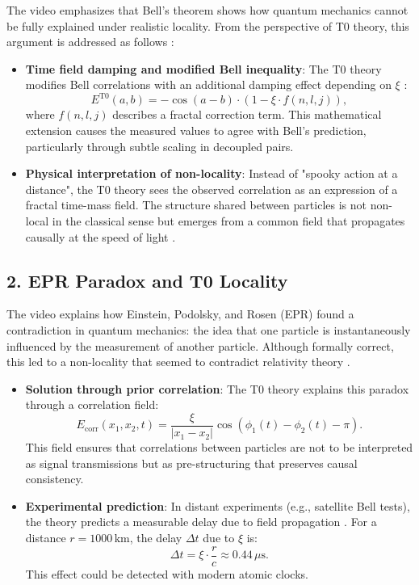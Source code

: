 	The video emphasizes that Bell's theorem shows how quantum mechanics cannot be fully explained under realistic locality. From the perspective of T0 theory, this argument is addressed as follows \cite{Bell_En, NoGoEn, 023_Bell_En_ch}:
	
	\begin{itemize}
		\item \textbf{Time field damping and modified Bell inequality}: The T0 theory modifies Bell correlations with an additional damping effect depending on $\xi$ \cite{Bell_En}:
		\[
		E^{\mathrm{T0}}(a,b) = -\cos(a-b) \cdot (1 - \xi \cdot f(n,l,j)),
		\]
		where $f(n,l,j)$ describes a fractal correction term. This mathematical extension causes the measured values to agree with Bell's prediction, particularly through subtle scaling in decoupled pairs.
		
		\item \textbf{Physical interpretation of non-locality}: Instead of "spooky action at a distance", the T0 theory sees the observed correlation as an expression of a fractal time-mass field. The structure shared between particles is not non-local in the classical sense but emerges from a common field that propagates causally at the speed of light \cite{131_scheinbar_instantan_En}.
	\end{itemize}
	
	\subsection*{2. EPR Paradox and T0 Locality}
	
	The video explains how Einstein, Podolsky, and Rosen (EPR) found a contradiction in quantum mechanics: the idea that one particle is instantaneously influenced by the measurement of another particle. Although formally correct, this led to a non-locality that seemed to contradict relativity theory \cite{VideoBell2024}.
	
	\begin{itemize}
		\item \textbf{Solution through prior correlation}: The T0 theory explains this paradox through a correlation field:
		\[
		E_{\mathrm{corr}}(x_1, x_2, t) = \frac{\xi}{|x_1 - x_2|} \cos\left(\phi_1(t) - \phi_2(t) - \pi\right).
		\]
		This field ensures that correlations between particles are not to be interpreted as signal transmissions but as pre-structuring that preserves causal consistency.
		
		\item \textbf{Experimental prediction}: In distant experiments (e.g., satellite Bell tests), the theory predicts a measurable delay due to field propagation \cite{131_scheinbar_instantan_En}. For a distance $r = 1000 \, \text{km}$, the delay $\Delta t$ due to $\xi$ is:
		\[
		\Delta t = \xi \cdot \frac{r}{c} \approx 0.44 \, \mu\text{s}.
		\]
		This effect could be detected with modern atomic clocks.
	\end{itemize}
	
